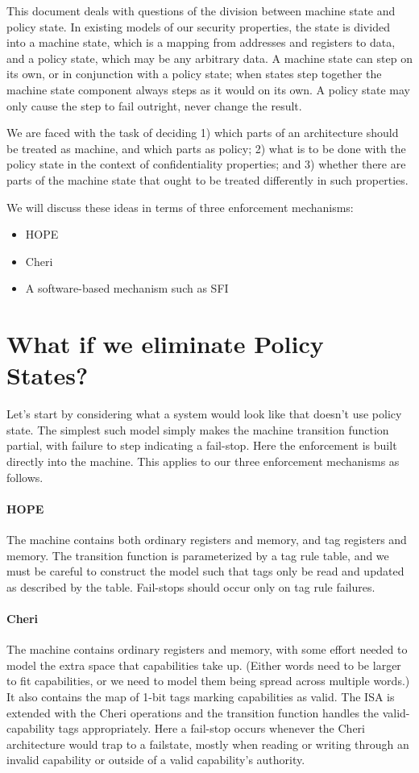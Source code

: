 \documentclass{article}
\begin{document}
This document deals with questions of the division between machine state and policy state.
In existing models of our security properties, the state is divided into a machine state,
which is a mapping from addresses and registers to data, and a policy state, which may be
any arbitrary data. A machine state can step on its own, or in conjunction with a policy
state; when states step together the machine state component always steps as it would on
its own. A policy state may only cause the step to fail outright, never change the result.

We are faced with the task of deciding 1) which parts of an architecture should be treated
as machine, and which parts as policy; 2) what is to be done with the policy state in the
context of confidentiality properties; and 3) whether there are parts of the machine state
that ought to be treated differently in such properties.

We will discuss these ideas in terms of three enforcement mechanisms:

\begin{itemize}
\item HOPE
\item Cheri
\item A software-based mechanism such as SFI
\end{itemize}

\section{What if we eliminate Policy States?}

Let's start by considering what a system would look like that doesn't use policy state. The
simplest such model simply makes the machine transition function partial, with failure to step
indicating a fail-stop. Here the enforcement is built directly into the machine. This applies to
our three enforcement mechanisms as follows.

\paragraph*{HOPE} The machine contains both ordinary registers and memory, and tag registers and memory.
The transition function is parameterized by a tag rule table, and we must be careful to construct the model
such that tags only be read and updated as described by the table. Fail-stops should occur only on tag
rule failures.

\paragraph*{Cheri} The machine contains ordinary registers and memory, with some effort needed to model
the extra space that capabilities take up. (Either words need to be larger to fit capabilities, or we
need to model them being spread across multiple words.) It also contains the map of 1-bit tags marking
capabilities as valid. The ISA is extended with the Cheri operations and the transition function handles
the valid-capability tags appropriately. Here a fail-stop occurs whenever the Cheri architecture would
trap to a failstate, mostly when reading or writing through an invalid capability or outside of a
valid capability's authority.
\end{document}
